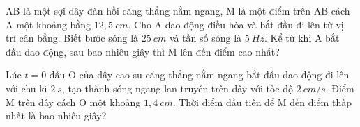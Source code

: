 \begin{ex}
	AB là một sợi dây đàn hồi căng thẳng nằm ngang, M là một điểm trên AB cách A một khoảng bằng $12,5 \ cm$. Cho A dao động điều hòa và bắt đầu đi lên từ vị trí cân bằng. Biết bước sóng là $25 \ cm$ và tần số sóng là $5 \ Hz$. Kể từ khi A bắt đầu dao động, sau bao nhiêu giây thì M lên đến điểm cao nhất? 
\end{ex}
\begin{ex}
	Lúc $t=0$ đầu O của dây cao su căng thẳng nằm ngang bắt đầu dao động đi lên với chu kì $2 \ s$, tạo thành sóng ngang lan truyền trên dây với tốc độ $2 \ cm/s$. Điểm M trên dây cách O một khoảng $1,4 \ cm$. Thời điểm đầu tiên để M đến điểm thấp nhất là bao nhiêu giây? 
\end{ex}